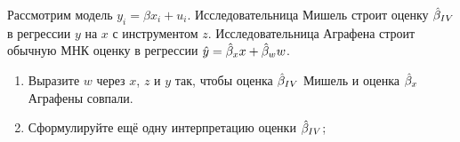 \begin{problem}
 Рассмотрим модель $y_i = \beta x_i + u_i$.
  Исследовательница Мишель строит оценку $\hat{\beta}_{IV}$ в регрессии $y$ на $x$ с инструментом $z$.
  Исследовательница Аграфена строит обычную МНК оценку в регрессии $\hat y = \hat{\beta}_{x} x + \hat{\beta}_{w} w$.

  \begin{enumerate}
    \item Выразите $w$ через $x$, $z$ и $y$ так, чтобы оценка $\hat{\beta}_{IV}$ Мишель и оценка $\hat{\beta}_{x}$ Аграфены совпали.
    \item Сформулируйте ещё одну интерпретацию оценки $\hat{\beta}_{IV}$;
  \end{enumerate}
  \begin{sol}

  \end{sol}
\end{problem}


